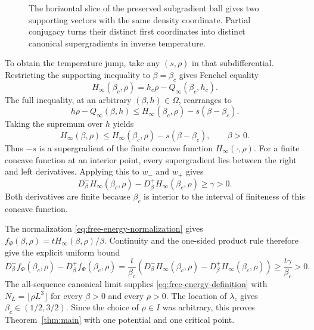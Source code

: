 \begin{figure}[hbp]
\centering
{}
\caption{The horizontal slice of the preserved subgradient ball gives two
supporting vectors with the same density coordinate. Partial conjugacy turns
their distinct first coordinates into distinct canonical supergradients in
inverse temperature.}\label{fig:fixed-density}
\end{figure}

To obtain the temperature jump, take any $(s,\rho)$ in that subdifferential.
Restricting the
supporting inequality to $\beta=\beta_c$ gives Fenchel equality
\[
 H_\infty(\beta_c,\rho)=h_c\rho-Q_\infty(\beta_c,h_c).
\]
The full inequality, at an arbitrary $(\beta,h)\in\Omega$, rearranges to
\[
 h\rho-Q_\infty(\beta,h)
 \le H_\infty(\beta_c,\rho)-s(\beta-\beta_c).
\]
Taking the supremum over $h$ yields
\begin{equation}\label{eq:canonical-support}
 H_\infty(\beta,\rho)
 \le H_\infty(\beta_c,\rho)-s(\beta-\beta_c),\qquad \beta>0.
\end{equation}
Thus $-s$ is a supergradient of the finite concave function
$H_\infty(\cdot,\rho)$. For a finite concave function at an interior point,
every supergradient lies between the right and left derivatives. Applying
this to $w_-$ and $w_+$ gives
\begin{equation}\label{eq:derivative-jump}
 D_\beta^-H_\infty(\beta_c,\rho)
 -D_\beta^+H_\infty(\beta_c,\rho)\ge\gamma>0.
\end{equation}
Both derivatives are finite because $\beta_c$ is interior to the interval
of finiteness of this concave function.

The normalization \eqref{eq:free-energy-normalization} gives
$f_\Phi(\beta,\rho)=tH_\infty(\beta,\rho)/\beta$. Continuity and the
one-sided product rule therefore give the explicit uniform bound
\[
 D_\beta^- f_\Phi(\beta_c,\rho)
 -D_\beta^+ f_\Phi(\beta_c,\rho)
 =\frac{t}{\beta_c}\left(
 D_\beta^-H_\infty(\beta_c,\rho)
 -D_\beta^+H_\infty(\beta_c,\rho)\right)
 \ge\frac{t\gamma}{\beta_c}>0.
\]
The all-sequence canonical limit supplies
\eqref{eq:free-energy-definition} with $N_L=\lfloor\rho L^3\rfloor$
for every $\beta>0$ and every $\rho>0$. The location of $\lambda_c$
gives $\beta_c\in(1/2,3/2)$. Since the choice of $\rho\in I$ was arbitrary,
this proves Theorem~\ref{thm:main} with one potential and one critical point.
